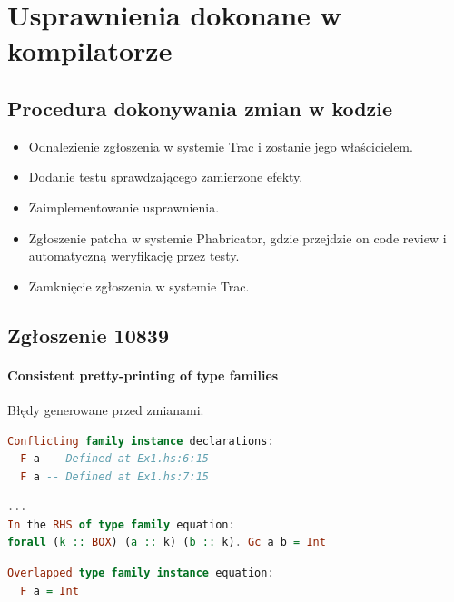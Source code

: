\documentclass[polish]{beamer}
\makeatletter
\newcommand*{\currentname}{\@currentlabelname}
\makeatother
\begin{document}
\section{Usprawnienia dokonane w kompilatorze} %

\subsection{Procedura dokonywania zmian w kodzie} %
\begin{tframe}{\currentname\cite{wiki}}
    \begin{itemize}
        \item Odnalezienie zgłoszenia w systemie Trac i zostanie jego właścicielem.
        \item Dodanie testu sprawdzającego zamierzone efekty. 
        \item Zaimplementowanie usprawnienia.
        \item Zgłoszenie patcha w systemie Phabricator, gdzie przejdzie on code review i automatyczną weryfikację przez testy.
        \item Zamknięcie zgłoszenia w systemie Trac.
    \end{itemize}
\end{tframe}

\subsection{Zgłoszenie 10839} %
\begin{frame}[t,fragile]{\currentname}
\framesubtitle{Consistent pretty-printing of type families}
\small
Błędy generowane przed zmianami.
\begin{block}{}
\begin{lstlisting}[language=Haskell,basicstyle=\tiny\ttfamily]
Conflicting family instance declarations:
  F a -- Defined at Ex1.hs:6:15
  F a -- Defined at Ex1.hs:7:15
\end{lstlisting}
\end{block}
\begin{block}{}
\begin{lstlisting}[language=Haskell,basicstyle=\tiny\ttfamily]
...
In the RHS of type family equation:
forall (k :: BOX) (a :: k) (b :: k). Gc a b = Int
\end{lstlisting}
\end{block}
\begin{block}{}
\begin{lstlisting}[language=Haskell,basicstyle=\tiny\ttfamily]
Overlapped type family instance equation:
  F a = Int
\end{lstlisting}
\end{block}
\end{frame}
\end{document}
